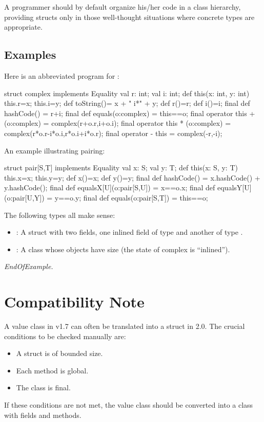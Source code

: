  A programmer should by default organize his/her code in a class
 hierarchy, providing structs only in those well-thought situations
 where concrete types are appropriate.

 \subsection{Examples}

Here is an abbreviated program for :
\begin{x10}
struct complex implements Equality {
  val r: int;
  val i: int;
  def this(x: int, y: int) {
    this.r=x;
    this.i=y;
  }
  def toString()= x + " i*" + y;
  def r()=r;
  def i()=i;  
  final def hashCode() = r+i;
  final def equals(o:complex) = this==o;
  final operator this + (o:complex) = complex(r+o.r,i+o.i);
  final operator this * (o:complex) = complex(r*o.r-i*o.i,r*o.i+i*o.r);
  final operator - this = complex(-r,-i);
}
\end{x10}
 

An example illustrating pairing:

\begin{x10}
struct pair[S,T] implements Equality {
  val x: S;
  val y: T;
  def this(x: S, y: T) {
    this.x=x;
    this.y=y;
  }
  def x()=x;
  def y()=y;  
  final def hashCode() = x.hashCode() + y.hashCode();
  final def equalsX[U](o:pair[S,U]) = x==o.x;
  final def equalsY[U](o:pair[U,Y]) = y==o.y;
  final def equals(o:pair[S,T]) = this==o;
}
\end{x10}

The following types all make sense: 
\begin{itemize}
\item {}: A struct with two fields, one inlined field of type  and another of type . 
\item {}: A class whose objects have size
   (the state of complex is
  ``inlined'').
\end{itemize}
\emph{EndOfExample.}


\section{Compatibility Note}

A value class in \Xten{} v1.7 can often be translated into a struct in \Xten{} 2.0. The crucial conditions to be checked manually are: \begin{itemize}
\item  A struct is of bounded size. 
\item  Each method is global. 
\item  The class is final.
\end{itemize}
 

If these conditions are not met, the value class should be converted
into a class with  fields and methods.

  
